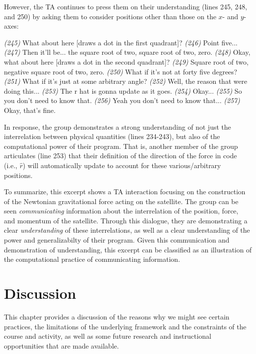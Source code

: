\documentclass{msuphddissertation}
\begin{document}
\begin{doublespace}
However, the TA continues to press them on their understanding (lines 245, 248, and 250) by asking them to consider positions other than those on the $x$- and $y$-axes: \begin{description}
\TA \textit{(245)} What about here [draws a dot in the first quadrant]?
\SD \textit{(246)} Point five...
\SB \textit{(247)} Then it'll be... the square root of two, square root of two, zero.
\TA \textit{(248)} Okay, what about here [draws a dot in the second quadrant]?
\SB \textit{(249)} Square root of two, negative square root of two, zero.
\TA \textit{(250)} What if it's not at forty five degrees?
\TA \textit{(251)} What if it's just at some arbitrary angle?
\SB \textit{(252)} Well, the reason that were doing this...			
\SD \textit{(253)} The r hat is gonna update as it goes.
\TA \textit{(254)} Okay...
\SD \textit{(255)} So you don’t need to know that.
\SB \textit{(256)} Yeah you don’t need {to know that}...		
\TA \textit{(257)} Okay, that’s fine.
\end{description}  In response, the group demonstrates a strong understanding of not just the interrelation between physical quantities (lines 234-243), but also of the computational power of their program.  That is, another member of the group articulates (line 253) that their definition of the direction of the force in code (i.e., $\hat{r}$) will automatically update to account for these various/arbitrary positions.

To summarize, this excerpt shows a TA interaction focusing on the construction of the Newtonian gravitational force acting on the satellite.  The group can be seen \textit{communicating} information about the interrelation of the position, force, and momentum of the satellite.  Through this dialogue, they are demonstrating a clear \textit{understanding} of these interrelations, as well as a clear understanding of the power and generalizabilty of their program.  Given this communication and demonstration of understanding, this excerpt can be classified as an illustration of the computational practice of communicating information.

%
%
%
%
%
%
%
%
%
%
%
%
%
%
%
%

\chapter{Discussion}\label{CH6:Discussion}

This chapter provides a discussion of the reasons why we might see certain practices, the limitations of the underlying framework and the constraints of the course and activity, as well as some future research and instructional opportunities that are made available.


\end{doublespace}
\end{document}
